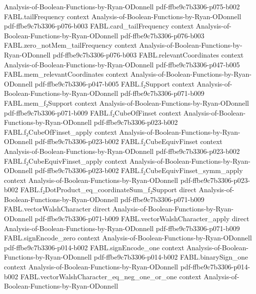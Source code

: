 \begin{theorem}
  {Analysis-of-Boolean-Functions-by-Ryan-ODonnell}
  {pdf-ffbe9c7b3306-p075-b002}
\proofstep
  {FABL.tailFrequency}
  {context}
  {Analysis-of-Boolean-Functions-by-Ryan-ODonnell}
  {pdf-ffbe9c7b3306-p076-b003}
\proofstep
  {FABL.card_tailFrequency}
  {context}
  {Analysis-of-Boolean-Functions-by-Ryan-ODonnell}
  {pdf-ffbe9c7b3306-p076-b003}
\proofstep
  {FABL.zero_notMem_tailFrequency}
  {context}
  {Analysis-of-Boolean-Functions-by-Ryan-ODonnell}
  {pdf-ffbe9c7b3306-p076-b003}
\proofstep
  {FABL.relevantCoordinates}
  {context}
  {Analysis-of-Boolean-Functions-by-Ryan-ODonnell}
  {pdf-ffbe9c7b3306-p047-b005}
\proofstep
  {FABL.mem_relevantCoordinates}
  {context}
  {Analysis-of-Boolean-Functions-by-Ryan-ODonnell}
  {pdf-ffbe9c7b3306-p047-b005}
\proofstep
  {FABL.f₂Support}
  {context}
  {Analysis-of-Boolean-Functions-by-Ryan-ODonnell}
  {pdf-ffbe9c7b3306-p071-b009}
\proofstep
  {FABL.mem_f₂Support}
  {context}
  {Analysis-of-Boolean-Functions-by-Ryan-ODonnell}
  {pdf-ffbe9c7b3306-p071-b009}
\proofstep
  {FABL.f₂CubeOfFinset}
  {context}
  {Analysis-of-Boolean-Functions-by-Ryan-ODonnell}
  {pdf-ffbe9c7b3306-p023-b002}
\proofstep
  {FABL.f₂CubeOfFinset_apply}
  {context}
  {Analysis-of-Boolean-Functions-by-Ryan-ODonnell}
  {pdf-ffbe9c7b3306-p023-b002}
\proofstep
  {FABL.f₂CubeEquivFinset}
  {context}
  {Analysis-of-Boolean-Functions-by-Ryan-ODonnell}
  {pdf-ffbe9c7b3306-p023-b002}
\proofstep
  {FABL.f₂CubeEquivFinset_apply}
  {context}
  {Analysis-of-Boolean-Functions-by-Ryan-ODonnell}
  {pdf-ffbe9c7b3306-p023-b002}
\proofstep
  {FABL.f₂CubeEquivFinset_symm_apply}
  {context}
  {Analysis-of-Boolean-Functions-by-Ryan-ODonnell}
  {pdf-ffbe9c7b3306-p023-b002}
\proofstep
  {FABL.f₂DotProduct_eq_coordinateSum_f₂Support}
  {direct}
  {Analysis-of-Boolean-Functions-by-Ryan-ODonnell}
  {pdf-ffbe9c7b3306-p071-b009}
\proofstep
  {FABL.vectorWalshCharacter}
  {direct}
  {Analysis-of-Boolean-Functions-by-Ryan-ODonnell}
  {pdf-ffbe9c7b3306-p071-b009}
\proofstep
  {FABL.vectorWalshCharacter_apply}
  {direct}
  {Analysis-of-Boolean-Functions-by-Ryan-ODonnell}
  {pdf-ffbe9c7b3306-p071-b009}
\proofstep
  {FABL.signEncode_zero}
  {context}
  {Analysis-of-Boolean-Functions-by-Ryan-ODonnell}
  {pdf-ffbe9c7b3306-p014-b002}
\proofstep
  {FABL.signEncode_one}
  {context}
  {Analysis-of-Boolean-Functions-by-Ryan-ODonnell}
  {pdf-ffbe9c7b3306-p014-b002}
\proofstep
  {FABL.binarySign_one}
  {context}
  {Analysis-of-Boolean-Functions-by-Ryan-ODonnell}
  {pdf-ffbe9c7b3306-p014-b002}
\proofstep
  {FABL.vectorWalshCharacter_eq_neg_one_or_one}
  {context}
  {Analysis-of-Boolean-Functions-by-Ryan-ODonnell}

\end{theorem}
